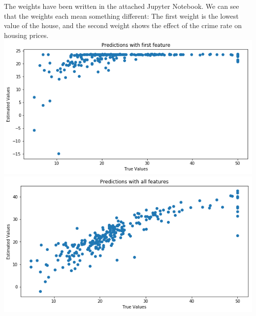 The weights have been written in the attached Jupyter Notebook. We can see that the weights each mean something different: The first weight is the lowest value of the house, and the second weight shows the effect of the crime rate on housing prices.\\
\includegraphics[width=\linewidth]{first.png}\\
\includegraphics[width=\linewidth]{all.png}